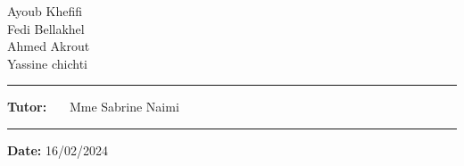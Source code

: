 \documentclass[a4paper, 12pt, twoside]{report}
\begin{document}
\begin{titlepage}
\vspace{0.1 cm}
\begin{center}
\Large{Ayoub Khefifi \\
Fedi Bellakhel  \\
Ahmed Akrout \\
Yassine chichti  }
\end{center}

\vspace{1.9 cm}
\hrule
\begin{center}
\Large{\textbf{Tutor:} \ \ \  Mme Sabrine Naimi} 
\end{center}

	\hrule
	\vspace{ 1 cm}
	\begin{center}
	\Large{\textbf{Date:} 16/02/2024}
	\end{center}
\end{titlepage}

\shipout\null %

\pagestyle{styletoc}

\begin{doublespace}
\renewcommand*{\contentsname}{Table des matières}
\tableofcontents



\end{doublespace}




\pagestyle{stylenor}




\end{document}
